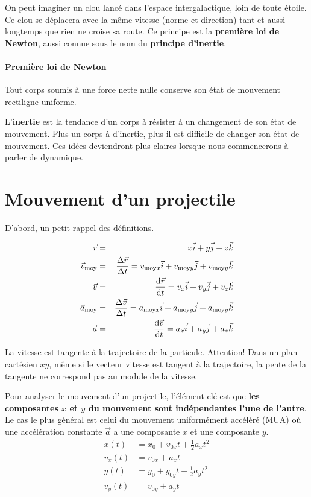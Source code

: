 On peut imaginer un clou lancé dans l'espace intergalactique, loin de toute
étoile.  Ce clou se déplacera avec la même vitesse (norme et direction) tant et
aussi longtemps que rien ne croise sa route.  Ce principe est la
\textbf{première loi de Newton}, aussi connue sous le nom du \textbf{principe
  d'inertie}.

\paragraph{Première loi de Newton}
Tout corps soumis à une force nette nulle conserve son état de mouvement
rectiligne uniforme.

L'\textbf{inertie} est la tendance d'un corps à résister à un changement de son
état de mouvement.  Plus un corps à d'inertie, plus il est difficile de changer
son état de mouvement.  Ces idées deviendront plus claires lorsque nous
commencerons à parler de dynamique.


\section{Mouvement d'un projectile}

D'abord, un petit rappel des définitions.

\begin{eqnarray*}
  \vec{r} &=& x \vec{i} + y \vec{j} + z \vec{k} \\
  \vec{v}_{\mathrm{moy}} &=& \frac{\Delta \vec{r}}{\Delta t} = v_{\mathrm{moy}x} \vec{i} + v_{\mathrm{moy}y} \vec{j} + v_{\mathrm{moy}y} \vec{k} \\
  \vec{v} &=& \frac{\mathrm{d} \vec{r}}{\mathrm{d} t} =  v_x \vec{i} + v_y \vec{j} + v_z \vec{k} \\
  \vec{a}_\mathrm{moy} &=& \frac{\Delta \vec{v}}{\Delta t} = a_{\mathrm{moy}x} \vec{i} + a_{\mathrm{moy}y} \vec{j} + a_{\mathrm{moy}y} \vec{k} \\
  \vec{a} &=& \frac{\mathrm{d} \vec{v}}{\mathrm{d} t} = a_x \vec{i} + a_y \vec{j} + a_z \vec{k}
\end{eqnarray*}

La vitesse est tangente à la trajectoire de la particule.  Attention! Dans un
plan cartésien $xy$, même si le vecteur vitesse est tangent à la trajectoire,
la pente de la tangente ne correspond pas au module de la vitesse.

Pour analyser le mouvement d'un projectile, l'élément clé est que \textbf{les
  composantes $x$ et $y$ du mouvement sont indépendantes l'une de l'autre}.  Le
cas le plus général est celui du mouvement uniformément accéléré (MUA) où une
accélération constante $\vec{a}$ a une composante $x$ et une composante $y$.
\begin{align*}
  x(t)   &= x_0 + v_{0x} t + \frac{1}{2} a_x t^2 \\
  v_x(t) &= v_{0x} + a_x t \\
  y(t)   &= y_0 + y_{0y} t + \frac{1}{2} a_y t^2 \\
  v_y(t) &= v_{0y} + a_y t
\end{align*}

